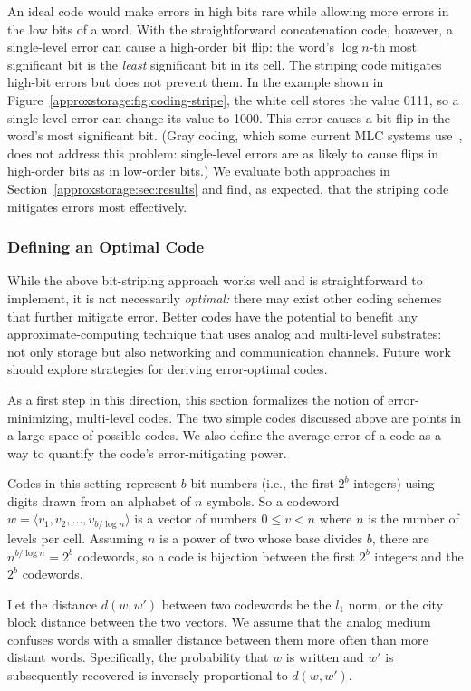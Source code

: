 An ideal code would make errors in high bits rare while allowing more errors
in the low bits of a word. With the straightforward concatenation code, however,
a single-level error can cause a high-order bit flip: the word's $\log n$-th
most significant bit is the \emph{least} significant bit in its cell.
The striping code mitigates high-bit errors but does not prevent them. In the
example shown in Figure~\ref{approxstorage:fig:coding-stripe}, the white cell stores the
value 0111, so a single-level error can change its value to 1000. This error
causes a bit flip in the word's most significant bit.
(Gray coding, which some current MLC systems use~\cite{improvingwrites}, does
not address this problem: single-level errors are as likely to cause flips in
high-order bits as in low-order bits.)
We evaluate both approaches in
Section~\ref{approxstorage:sec:results} and find, as expected, that the striping code
mitigates errors most effectively.


\subsubsection{Defining an Optimal Code}

While the above bit-striping approach works well and is straightforward to
implement, it is not necessarily \emph{optimal:} there may exist other
coding schemes that further mitigate error.
Better codes have the potential to benefit any approximate-computing
technique that uses analog and multi-level substrates: not only storage but
also networking and communication channels.
Future work should explore strategies for deriving error-optimal codes.

As a first step in this direction, this section formalizes the notion of
error-minimizing, multi-level codes.
The two simple codes discussed above are points in a large space of possible
codes.
We also define the average error of a code as a way to quantify the code's error-mitigating
power.


Codes in this setting represent $b$-bit numbers (i.e., the first $2^b$ integers) using digits drawn from an alphabet of $n$ symbols. So a codeword $w = \langle v_1,
v_2, \dots, v_{b/\log n} \rangle$ is a vector of numbers $0 \le v < n$
where $n$ is the number of levels per cell. Assuming $n$ is a power of
two whose base divides $b$, there are $n ^ {b / \log n} = 2 ^ b$
codewords, so a code is bijection between the first $2^b$ integers and
the $2^b$ codewords.

Let the distance $d(w, w')$ between two codewords be the $l_1$ norm,
or the city block distance between the two vectors. We assume that the analog
medium confuses words with a smaller distance between them more often than
more distant words. Specifically, the probability that $w$ is written and $w'$ is subsequently recovered is inversely proportional to $d(w, w')$.

